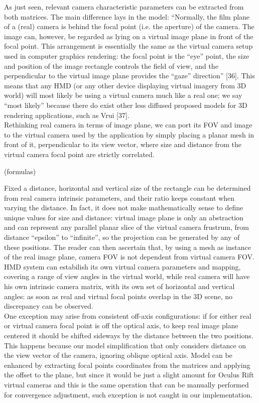 As just seen, relevant camera characteristic parameters can be extracted from both matrices. The main difference lays in the model: “Normally, the film plane of a (real) camera is behind the focal point (i.e. the aperture) of the camera. The image can, however, be regarded as lying on a virtual image plane in front of the focal point. This arrangement is essentially the same as the virtual camera setup used in computer graphics rendering: the focal point is the “eye” point, the size and position of the image rectangle controls the field of view, and the perpendicular to the virtual image plane provides the “gaze” direction” [36]. This means that any HMD (or any other device displaying virtual imagery from 3D world) will most likely be using a virtual camera much like a real one; we say “most likely” because there do exist other less diffused proposed models for 3D rendering applications, such as Vrui [37].\\
Rethinking real camera in terms of image plane, we can port its FOV and image to the virtual camera used by the application by simply placing a planar mesh in front of it, perpendicular to its view vector, where size and distance from the virtual camera focal point are strictly correlated. 

(formulas)

Fixed a distance, horizontal and vertical size of the rectangle can be determined from real camera intrinsic parameters, and their ratio keeps constant when varying the distance. In fact, it does not make mathematically sense to define unique values for size and distance: virtual image plane is only an abstraction and can represent any parallel planar slice of the virtual camera frustrum, from distance “epsilon” to “infinite”, so the projection can be generated by any of these positions. The reader can then ascertain that, by using a mesh as instance of the real image plane, camera FOV is not dependent from virtual camera FOV. HMD system can estabilish its own virtual camera parameters and mapping, covering a range of view angles in the virtual world, while real camera will have his own intrinsic camera matrix, with its own set of horizontal and vertical angles: as soon as real and virtual focal points overlap in the 3D scene, no discrepancy can be observed.\\
One exception may arise from consistent off-axis configurations: if for either real or virtual camera focal point is off the optical axis, to keep real image plane centered it should be shifted sideways by the distance between the two positions. This happens because our model simplification that only considers distance on the view vector of the camera, ignoring oblique optical axis. Model can be enhanced by extracting focal points coordinates from the matrices and applying the offset to the plane, but since it would be just a slight amount for Oculus Rift virtual cameras and this is the same operation that can be manually performed for convergence adjustment, such exception is not caught in our implementation.

